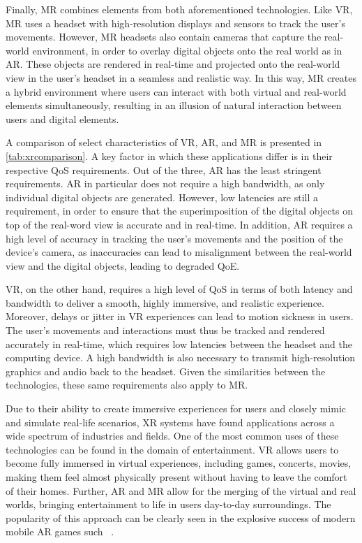 Finally, \gls{MR} combines elements from both aforementioned technologies.
Like \gls{VR}, \gls{MR} uses a headset with high-resolution displays and sensors to track the user's movements.
However, \gls{MR} headsets also contain cameras that capture the real-world environment, in order to overlay digital objects onto the real world as in \gls{AR}.
These objects are rendered in real-time and projected onto the real-world view in the user's headset in a seamless and realistic way.
In this way, \gls{MR} creates a hybrid environment where users can interact with both virtual and real-world elements simultaneously, resulting in an illusion of natural interaction between users and digital elements.



A comparison of select characteristics of \gls{VR}, \gls{AR}, and \gls{MR} is presented in \cref{tab:xrcomparison}.
A key factor in which these applications differ is in their respective \gls{QoS} requirements.
Out of the three, \gls{AR} has the least stringent requirements.
\gls{AR} in particular does not require a high bandwidth, as only individual digital objects are generated.
However, low latencies are still a requirement, in order to ensure that the superimposition of the digital objects on top of the real-word view is accurate and in real-time.
In addition, \gls{AR} requires a high level of accuracy in tracking the user's movements and the position of the device's camera, as inaccuracies can lead to misalignment between the real-world view and the digital objects, leading to degraded \gls{QoE}.

\gls{VR}, on the other hand, requires a high level of \gls{QoS} in terms of both latency and bandwidth to deliver a smooth, highly immersive, and realistic experience.
Moreover, delays or jitter in \gls{VR} experiences can lead to motion sickness in users.
The user's movements and interactions must thus be tracked and rendered accurately in real-time, which requires low latencies between the headset and the computing device.
A high bandwidth is also necessary to transmit high-resolution graphics and audio back to the headset.
Given the similarities between the technologies, these same requirements also apply to \gls{MR}.

\medskip

Due to their ability to create immersive experiences for users and closely mimic and simulate real-life scenarios, \gls{XR} systems have found applications across a wide spectrum of industries and fields.
One of the most common uses of these technologies can be found in the domain of entertainment.
\gls{VR} allows users to become fully immersed in virtual experiences, including games, concerts, movies, making them feel almost physically present without having to leave the comfort of their homes.
Further, \gls{AR} and \gls{MR} allow for the merging of the virtual and real worlds, bringing entertainment to life in users day-to-day surroundings.
The popularity of this approach can be clearly seen in the explosive success of modern mobile \gls{AR} games such ~\cite{pokemongo}.

